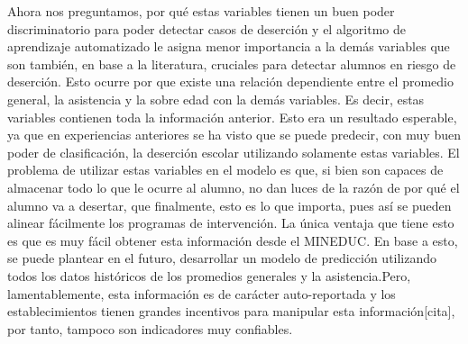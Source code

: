 Ahora nos preguntamos, por qué estas variables tienen un buen poder discriminatorio para poder detectar casos de deserción y el algoritmo de aprendizaje automatizado le asigna menor importancia a la demás variables que son también, en base a la literatura, cruciales para detectar alumnos en riesgo de deserción. Esto ocurre por que existe una relación dependiente entre el promedio general, la asistencia y la sobre edad con la demás variables. Es decir, estas variables contienen toda la información anterior. Esto era un resultado esperable, ya que en experiencias anteriores se ha visto que se puede predecir, con muy buen poder de clasificación, la deserción escolar utilizando solamente estas variables. El problema de utilizar estas variables en el modelo es que, si bien son capaces de almacenar todo lo que le ocurre al alumno, no dan luces de la razón de por qué el alumno va a desertar, que finalmente, esto es lo que importa, pues así se pueden alinear fácilmente los programas de intervención. La única ventaja que tiene esto es que es muy fácil obtener esta información desde el MINEDUC. En base a esto, se puede plantear en el futuro, desarrollar un modelo de predicción utilizando todos los datos históricos de los promedios generales y la asistencia.Pero, lamentablemente, esta información es de carácter auto-reportada y los establecimientos tienen grandes incentivos para manipular esta información[cita], por tanto, tampoco son indicadores muy confiables.

